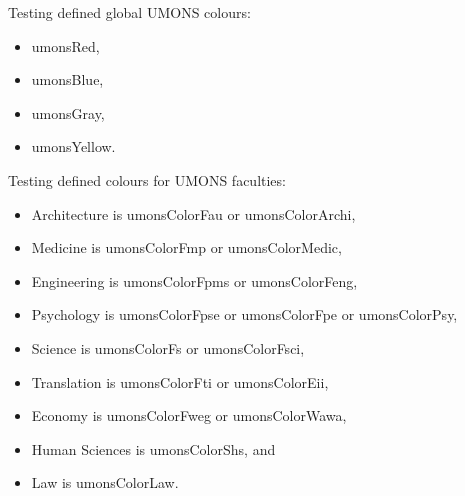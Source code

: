 \documentclass{minimal}
\begin{document}
Testing defined global UMONS colours: 
\begin{itemize}
	\item \textcolor{umonsRed}{umonsRed},
	\item \textcolor{umonsBlue}{umonsBlue},
	\item \textcolor{umonsGray}{umonsGray},
	\item \textcolor{umonsYellow}{umonsYellow}.
\end{itemize}

Testing defined colours for UMONS faculties: 
\begin{itemize}
	\item Architecture is \textcolor{umonsColorFau}{umonsColorFau} or \textcolor{umonsColorArchi}{umonsColorArchi},
	\item Medicine is \textcolor{umonsColorFmp}{umonsColorFmp} or \textcolor{umonsColorMedic}{umonsColorMedic},
	\item Engineering is \textcolor{umonsColorFpms}{umonsColorFpms} or \textcolor{umonsColorFeng}{umonsColorFeng},
	\item Psychology is \textcolor{umonsColorFpse}{umonsColorFpse} or \textcolor{umonsColorFpe}{umonsColorFpe} or \textcolor{umonsColorPsy}{umonsColorPsy},
	\item Science is \textcolor{umonsColorFs}{umonsColorFs} or \textcolor{umonsColorFsci}{umonsColorFsci},
	\item Translation is \textcolor{umonsColorFti}{umonsColorFti} or \textcolor{umonsColorEii}{umonsColorEii},
	\item Economy is \textcolor{umonsColorFweg}{umonsColorFweg} or \textcolor{umonsColorWawa}{umonsColorWawa},
	\item Human Sciences is \textcolor{umonsColorShs}{umonsColorShs}, and
	\item Law is \textcolor{umonsColorLaw}{umonsColorLaw}.
\end{itemize}



\end{document}
